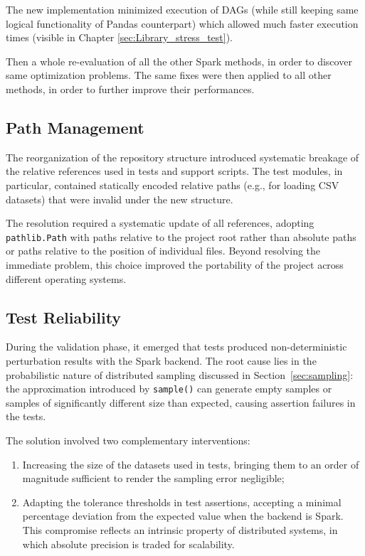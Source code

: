 \documentclass[../main.tex]{subfiles}
\begin{document}
The new implementation minimized execution of DAGs (while still keeping same logical functionality of Pandas counterpart) which allowed much faster execution times (visible in Chapter \ref{sec:Library_stress_test}). 

Then a whole re-evaluation of all the other Spark methods, in order to discover same optimization problems. The same fixes were then applied to all other methods, in order to further improve their performances.


\subsection{Path Management}
\label{sec:paths}

The reorganization of the repository structure introduced systematic breakage of the 
relative references used in tests and support scripts. The test modules, in particular, 
contained statically encoded relative paths (e.g., for loading CSV datasets) that were 
invalid under the new structure.

The resolution required a systematic update of all references, adopting 
\texttt{pathlib.Path} with paths relative to the project root rather than absolute paths 
or paths relative to the position of individual files. Beyond resolving the immediate 
problem, this choice improved the portability of the project across different operating 
systems.

\subsection{Test Reliability}
\label{sec:test_reliability}

During the validation phase, it emerged that tests produced non-deterministic 
perturbation results with the Spark backend. The root cause lies in the probabilistic 
nature of distributed sampling discussed in Section~\ref{sec:sampling}: the approximation 
introduced by \texttt{sample()} can generate empty samples or samples of significantly 
different size than expected, causing assertion failures in the tests.

The solution involved two complementary interventions:

\begin{enumerate}
    \item Increasing the size of the datasets used in tests, bringing them to an order of 
          magnitude sufficient to render the sampling error negligible;
    \item Adapting the tolerance thresholds in test assertions, accepting a minimal 
          percentage deviation from the expected value when the backend is Spark. This 
          compromise reflects an intrinsic property of distributed systems, in which 
          absolute precision is traded for scalability.
\end{enumerate}
\end{document}
